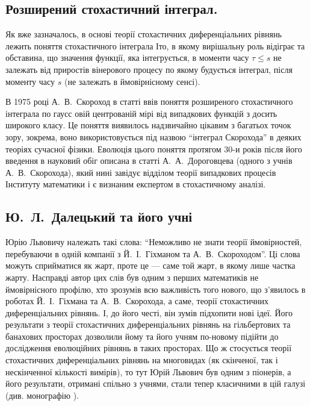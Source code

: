 \documentclass[11pt, reqno]{amsart}
\begin{document}
\subsection{Розширений стохастичний інтеграл.}
Як вже зазначалось, в основі теорії стохастичних диференціальних рівнянь лежить поняття стохастичного інтеграла Іто, в якому вирішальну роль відіграє та обставина, що значення функції, яка інтегрується, в моменти часу $\tau \leq s$ не залежать від приростів вінерового процесу по якому будується інтеграл, після моменту часу $s$ (не залежать в ймовірнісному сенсі).

В 1975 році А.~В.~Скороход в статті \cite{b14} ввів поняття розширеного стохастичного інтеграла по гаусс
овій центрованій мірі від випадкових функцій з досить широкого класу. Це поняття виявилось надзвичайно цікавим з багатьох точок зору, зокрема, воно використовується під назвою ``інтеграл Скорохода'' в деяких теоріях сучасної фізики. Еволюція цього поняття протягом 30-и років після його введення в науковий обіг описана в статті \cite{b15} А.~А.~Дороговцева (одного з учнів А.~В.~Скорохода), який нині завідує відділом теорії випадкових процесів Інституту математики і є визнаним експертом в  стохастичному аналізі.

\subsection{Ю.~Л.~Далецький та його учні}
Юрію Львовичу належать такі слова: ``Неможливо не знати теорії ймовірностей, перебуваючи в одній компанії з Й.~І.~Гіхманом та А.~В.~Скороходом''. Ці слова можуть сприйматися як жарт, проте це --- саме той жарт, в якому лише частка жарту. Насправді автор цих слів був одним з перших математиків не ймовірнісного профілю, хто зрозумів всю важливість того нового, що з'явилось в роботах Й.~І.~Гіхмана та А.~В.~Скорохода, а саме, теорії стохастичних диференціальних рівнянь. І, до його честі, він зумів підхопити нові ідеї. Його результати з теорії стохастичних диференціальних рівнянь на гільбертових та банахових просторах дозволили йому та його учням по-новому підійти до дослідження еволюційних рівнянь в таких просторах. Що ж стосується теорії стохастичних диференціальних рівнянь на многовидах (як скінченої, так і нескінченної кількості вимірів), то тут Юрій Львович був одним з піонерів, а його результати, отримані спільно з учнями, стали тепер класичними в цій галузі (див. монографію \cite{b16}).
\end{document}
